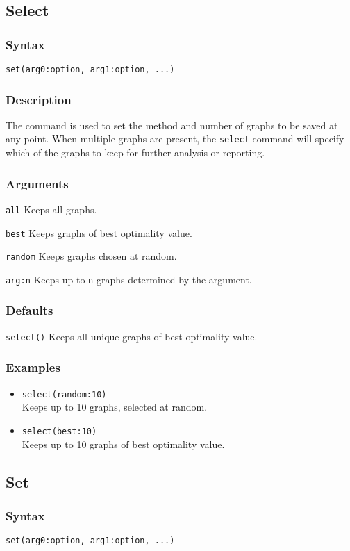 \documentclass[11pt]{article}
\begin{document}
	\subsection{Select}
		\subsubsection{Syntax}
			\texttt{set(arg0:option, arg1:option, ...)}
		\subsubsection{Description}
			The command is used to set the method and number of graphs to be saved at any point.
			When multiple graphs are present, the \texttt{select} command will specify which of the graphs to
			keep for further analysis or reporting.
		\subsubsection{Arguments}
			\noindent \texttt{all} Keeps all graphs.
		
			\smallskip		
			\noindent \texttt{best} Keeps graphs of best optimality value.
			
			\smallskip		
			\noindent \texttt{random} Keeps graphs chosen at random.
			
			\smallskip		
			\noindent \texttt{arg:n} Keeps up to \texttt{n} graphs determined by the argument.
		\subsubsection{Defaults}
			\texttt{select()} Keeps all unique graphs of best optimality value.
		\subsubsection{Examples}
				\begin{itemize}
					\item{\texttt{select(random:10)}\\ Keeps up to 10 graphs, selected at random.}
					\item{\texttt{select(best:10)}\\ Keeps up to 10 graphs of best optimality value.}
				\end{itemize}
			
	\subsection{Set}
		\subsubsection{Syntax}
				\texttt{set(arg0:option, arg1:option, ...)}
\end{document}
